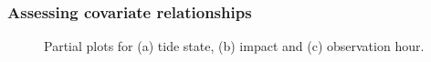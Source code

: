 \begin{frame}[fragile]
\frametitle{Assessing covariate relationships}
\begin{figure}[h!]
  \centering
  \hfill
  \caption{Partial plots for (a) tide state, (b) impact and (c) observation hour.}
  \label{fig:partials}
\end{figure}
\end{frame}

